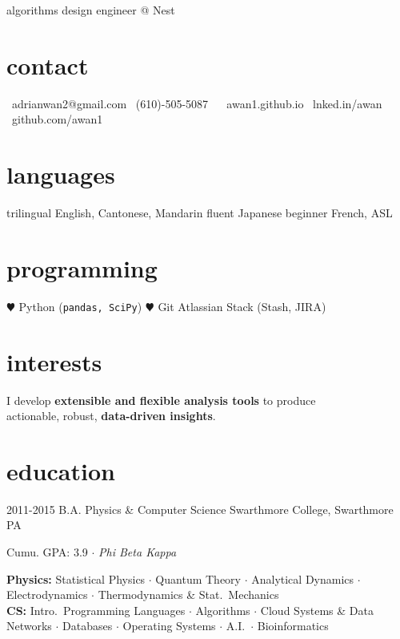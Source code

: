 \documentclass[]{friggeri-cv}
\begin{document}
       {algorithms design engineer @ Nest}


\begin{aside}
  \section{contact}
    \href{mailto:adrianwan2@gmail.com}{\faEnvelope}~adrianwan2@gmail.com
    \faPhone~(610)-505-5087
    ~
    \href{http://awan1.github.io}{\faGlobe}~awan1.github.io
    \href{http://linkedin.com/in/adrianwan2}{\faLinkedin}~lnked.in/awan
    \href{http://github.com/awan1}{\faGithub}~github.com/awan1
  \section{languages}
    trilingual English, Cantonese, Mandarin
    fluent Japanese
    beginner French, ASL
  \section{programming}
    {\color{red} $\varheart$} Python
    (\texttt{pandas, SciPy})
    {\color{red} $\varheart$} Git
    Atlassian Stack
    (Stash, JIRA)

\end{aside}

\section{interests}
I develop \textbf{extensible and flexible analysis tools} to produce \\
actionable, robust, \textbf{data-driven insights}.

\section{education}

\begin{entrylist}
  \entry
    {2011-2015}
    {B.A. {\normalfont Physics \& Computer Science}}
    {Swarthmore College, Swarthmore PA}
    {Cumu. GPA: 3.9 $\cdot$ \emph{Phi Beta Kappa} %
     \smallskip

     \textbf{Physics:}
     Statistical Physics $\cdot$
     Quantum Theory $\cdot$
     Analytical Dynamics $\cdot$
     \\
     Electrodynamics $\cdot$
     Thermodynamics \& Stat.\ Mechanics %
     \\
     \textbf{CS:}
     Intro.\ Programming Languages $\cdot$
     Algorithms $\cdot$
     Cloud Systems \& Data \\ Networks $\cdot$
     Databases $\cdot$
     Operating Systems $\cdot$
     A.I.\ $\cdot$
     Bioinformatics %
     }
\end{entrylist}
\end{document}
